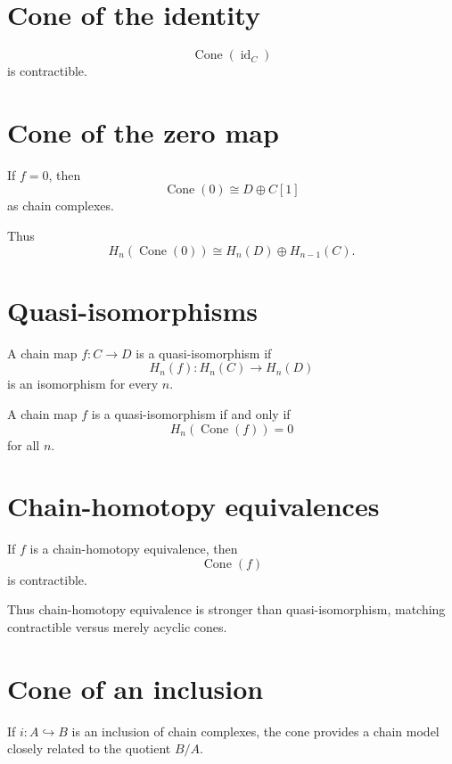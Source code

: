 \section{Cone of the identity}
\begin{theorem}
\label{thm:viii24-id-cone}
\[
\operatorname{Cone}(\operatorname{id}_C)
\]
is contractible.
\end{theorem}

\section{Cone of the zero map}
If \(f=0\), then
\[
\operatorname{Cone}(0)\cong D\oplus C[1]
\]
as chain complexes.

Thus
\[
H_n(\operatorname{Cone}(0))
\cong
H_n(D)\oplus H_{n-1}(C).
\]

\section{Quasi-isomorphisms}
\begin{definition}
\label{def:viii24-quasi}
A chain map \(f:C\to D\) is a quasi-isomorphism if
\[
H_n(f):H_n(C)\to H_n(D)
\]
is an isomorphism for every \(n\).
\end{definition}

\begin{theorem}
\label{thm:viii24-quasi-cone}
A chain map \(f\) is a quasi-isomorphism if and only if
\[
H_n(\operatorname{Cone}(f))=0
\]
for all \(n\).
\end{theorem}

\section{Chain-homotopy equivalences}
\begin{theorem}
\label{thm:viii24-homotopy-cone}
If \(f\) is a chain-homotopy equivalence, then
\[
\operatorname{Cone}(f)
\]
is contractible.
\end{theorem}

Thus chain-homotopy equivalence is stronger than quasi-isomorphism, matching
contractible versus merely acyclic cones.

\section{Cone of an inclusion}
If \(i:A\hookrightarrow B\) is an inclusion of chain complexes, the cone
provides a chain model closely related to the quotient \(B/A\).

